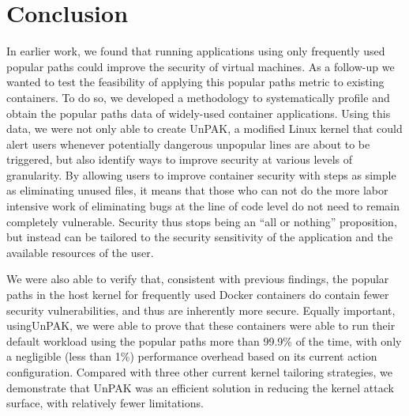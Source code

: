 \section{Conclusion}
\label{sec.conclusion}
In earlier work, we found that running applications using only frequently used popular paths could improve the security of virtual machines. 
As a follow-up we wanted to test the feasibility of applying this popular paths metric to existing containers. 
To do so, we developed a methodology to systematically profile and obtain the popular paths data of widely-used container applications. 
Using this data, we were not only able to create UnPAK, a modified Linux kernel that could alert users whenever potentially dangerous unpopular lines are about to be triggered, 
but  also identify ways to improve security at various levels of granularity. By allowing users to improve container security with steps as simple as eliminating unused files, 
it means that those who can not do the more labor intensive work of eliminating bugs at the line of code level do not need to remain completely vulnerable. 
Security thus stops being an ``all or nothing'' proposition, but instead can be tailored to the security sensitivity of the application and the available resources of the user. 

We were also able to verify that, consistent with previous findings, the popular paths in the host kernel for frequently used Docker containers do contain fewer security vulnerabilities, 
and thus are inherently more secure. Equally important, usingUnPAK, we were able to prove that  these containers were able to run their default workload using the popular paths 
more than 99.9\% of the time, with only a negligible (less than 1\%) performance overhead based on its current action configuration. 
Compared with three other current kernel tailoring strategies, we demonstrate that UnPAK was an efficient solution in reducing the kernel attack surface, with relatively fewer limitations. 